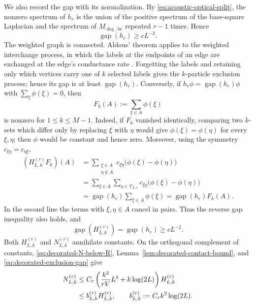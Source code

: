 \documentclass[11pt]{article}
\numberwithin{equation}{section}
\theoremstyle{remark}
\newcommand{\1}{\mathbf 1}
\newcommand{\gap}{\operatorname{gap}}
\begin{document}
We also record the gap with its normalization.  By
\eqref{eq:acoustic-optical-split}, the nonzero spectrum of \(h_r\) is the
union of the positive spectrum of the base-square Laplacian and the
spectrum of \(M_{\deg,\mathrm{bc}}\) repeated \(r-1\) times.  Hence
\begin{equation}
 \gap(h_r)\geq cL^{-2}.
 \label{eq:decorated-one-particle-gap}
\end{equation}
The weighted graph is connected.  Aldous' theorem applies to the weighted
interchange process, in which the labels at the endpoints of an edge are
exchanged at the edge's conductance rate
\cite{CaputoLiggettRichthammer2010}.  Forgetting the labels and retaining
only which vertices carry one of \(k\) selected labels gives the
\(k\)-particle exclusion process; hence its gap is at least
\(\gap(h_r)\).  Conversely,
if \(h_r\phi=\gap(h_r)\phi\) with \(\sum_\xi\phi(\xi)=0\), then
\[
 F_k(A):=\sum_{\xi\in A}\phi(\xi)
\]
is nonzero for \(1\leq k\leq M-1\).  Indeed, if \(F_k\) vanished
identically, comparing two \(k\)-sets which differ only by replacing
\(\xi\) with \(\eta\) would give \(\phi(\xi)=\phi(\eta)\) for every
\(\xi,\eta\); then \(\phi\) would be constant and hence zero.  Moreover,
using the symmetry \(c_{\xi\eta}=c_{\eta\xi}\),
\begin{align*}
 (H_{L,k}^{(r)}F_k)(A)
 &=\sum_{\substack{\xi\in A\\ \eta\notin A}}
 c_{\xi\eta}\bigl(\phi(\xi)-\phi(\eta)\bigr)\\
 &=\sum_{\xi\in A}\sum_{\eta\in\mathcal V_{L,r}}
 c_{\xi\eta}\bigl(\phi(\xi)-\phi(\eta)\bigr)\\
 &=\gap(h_r)\sum_{\xi\in A}\phi(\xi)
 =\gap(h_r)F_k(A).
\end{align*}
In the second line the terms with \(\xi,\eta\in A\) cancel in pairs.
Thus the reverse gap inequality also holds, and
\begin{equation}
 \gap(H_{L,k}^{(r)})=\gap(h_r)\geq cL^{-2}.
 \label{eq:decorated-exclusion-gap}
\end{equation}
Both \(H_{L,k}^{(r)}\) and \(N_{L,k}^{(r)}\) annihilate constants.  On the
orthogonal complement of constants,
\eqref{eq:decorated-N-below-R},
Lemma~\ref{lem:decorated-contact-bound}, and
\eqref{eq:decorated-exclusion-gap} give
\begin{align}
 N_{L,k}^{(r)}
 &\leq C_r\left(\frac{k^2}{rV}L^2
       +k\log(2L)\right)H_{L,k}^{(r)}\notag\\
 &\leq b_{L,k}^{(r)}H_{L,k}^{(r)},
 \qquad b_{L,k}^{(r)}:=C_rk^2\log(2L).
 \label{eq:decorated-first-order-bound}
\end{align}
\end{document}
